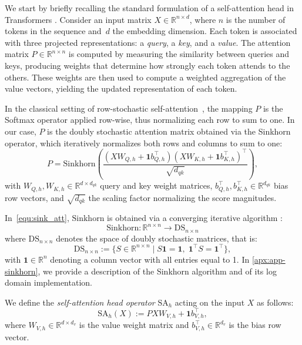 \documentclass{article}
\newcommand{\R}{\mathbb{R}}
\theoremstyle{definition}
\theoremstyle{plain}
\newcommand{\DS}{\mathrm{DS}_{n \times n}}
\newcommand{\lra}{\longrightarrow}
\newcommand{\beq}{\begin{equation}}
\newcommand{\eeq}{\end{equation}}
\begin{document}
{{We start by briefly recalling the standard formulation of a self-attention head in Transformers \cite{vaswani2017attention}. Consider an input matrix $X \in \mathbb{R}^{n \times d}$, where $n$ is the number of tokens in the sequence and~$d$ the embedding dimension. Each token is associated with three projected representations: a \textit{query}, a \textit{key}, and a \textit{value}. The attention matrix $P \in \mathbb{R}^{n \times n}$ is computed by measuring the similarity between queries and keys, producing weights that determine how strongly each token attends to the others. These weights are then used to compute a weighted aggregation of the value vectors, yielding the updated representation of each token.}

In the classical setting of row-stochastic self-attention~\cite{vaswani2017attention}, the mapping $P$ is the Softmax operator applied row-wise, thus normalizing each row to sum to one. {In our case,} $P$ is the doubly stochastic attention matrix obtained via the Sinkhorn operator, which iteratively normalizes both rows and columns to sum to one:
\begin{equation}\label{equ:sink_att}
P = \mathrm{Sinkhorn}\!\left(\frac{(X W_{Q,h} +
\mathbf{1} b_{Q,h}^\top) (X W_{K,h} + \mathbf{1}
b_{K,h}^\top)^\top}{\sqrt{d_{qk}}}\right),
\end{equation}
with $W_{Q,h}, W_{K,h} \in \mathbb{R}^{d \times d_{qk}}$ query and key weight matrices, $b_{Q,h}^\top, b_{K,h}^\top\in \mathbb{R}^{d_{qk}}$ bias row vectors, {and $\sqrt{d_{qk}}$ the scaling factor normalizing the score magnitudes}.

{In~\ref{equ:sink_att}, $\mathrm{Sinkhorn}$ is obtained via a converging iterative algorithm \cite{Sinkhorn1964,Sinkhorn1967ConcerningNM}}:
$$
\mathrm{Sinkhorn}: \R^{n \times n} \lra \DS
$$
where $\DS$ denotes the space of doubly stochastic matrices, that is:
$$
\mathrm{DS}_{n \times n}:= \{ S \in \mathbb{R}^{n\times n} \mid
S\mathbf{1} = \mathbf{1},\;
\mathbf{1}^\top S = \mathbf{1}^\top \},
$$
with $\mathbf{1} \in \mathbb{R}^n$ denoting a column vector with all entries equal to 1. In \cref{apx:app-sinkhorn}, we provide a description of the Sinkhorn algorithm and of its log domain implementation.

We define the \textit{self-attention head operator} $\mathrm{SA}_h$ acting on the input $X$ as follows:
\beq\label{sah}
\mathrm{SA}_h(X) := P X W_{V,h} + \mathbf{1} b_{V,h}^\top,
\eeq
where $W_{V,h} \in \mathbb{R}^{d \times d_v}$ is the value weight matrix{ and $b_{V,h}^\top\in \mathbb{R}^{d_v}$ is the bias row vector}. 

}
\end{document}
